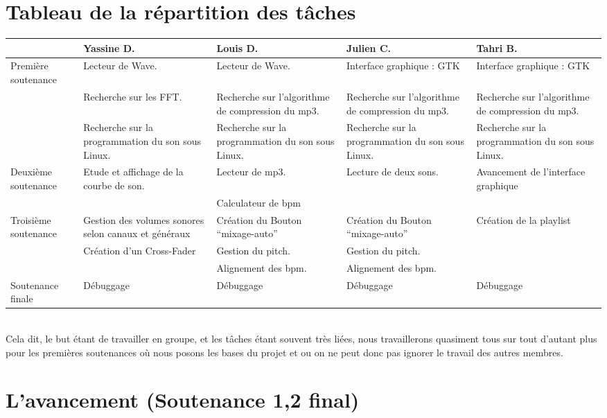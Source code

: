 \documentclass[12pt]{report}
\begin{document}
    \section{Tableau de la répartition des tâches}
    \begin{center}
    \begin{tabular}{|p{2 cm}||p{2.5cm}|p{2.5cm}|p{2.5cm}|p{2.5cm}|}
\hline
 & Yassine D. & Louis D. & Julien C. & Tahri B.
\\
\hline \hline Première soutenance
 & Lecteur de Wave.
 & Lecteur de Wave.
 & Interface graphique : GTK
 & Interface graphique : GTK
\\
 & Recherche sur les FFT.
 & Recherche sur l'algorithme de compression du mp3.
 & Recherche sur l'algorithme de compression du mp3.
 & Recherche sur l'algorithme de compression du mp3.
\\
 & Recherche sur la programmation du son sous Linux.
 & Recherche sur la programmation du son sous Linux.
 & Recherche sur la programmation du son sous Linux.
 & Recherche sur la programmation du son sous Linux.
\\
\hline Deuxième soutenance
 & Etude et affichage de la courbe de son.
 & Lecteur de mp3.
 & Lecture de deux sons.
 & Avancement de l'interface graphique
\\
 &
 & Calculateur de bpm
 &
 &
\\
\hline Troisième soutenance
 & Gestion des volumes sonores selon canaux et généraux
 & Création du Bouton ``mixage-auto''
 & Création du Bouton ``mixage-auto''
 & Création de la playlist
\\
 & Création d'un Cross-Fader
 & Gestion du pitch.
 & Gestion du pitch.
 &
\\
 &
 & Alignement des bpm.
 & Alignement des bpm.
 &
\\
\hline Soutenance finale
 & Débuggage
 & Débuggage
 & Débuggage
 & Débuggage
\\
\hline
\end{tabular}
    \end{center}
    \\
Cela dit, le but étant de travailler en groupe, et les tâches
étant souvent très liées, nous travaillerons quasiment tous sur
tout d'autant plus pour les premières soutenances où nous posons
les bases du projet et ou on ne peut donc pas ignorer le travail
des autres membres.
    \section{L'avancement (Soutenance 1,2 final)} 
\end{document}
